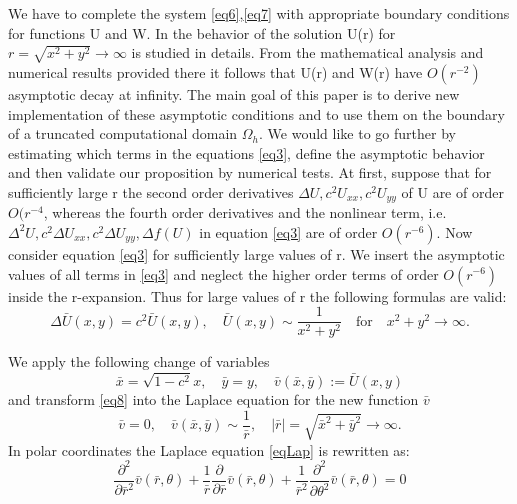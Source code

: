 \documentclass[12pt]{article}
\theoremstyle{theorem}
\theoremstyle{defi}
\begin{document}
We have to complete the system \ref{eq6},\ref{eq7} with appropriate boundary conditions for functions U and W. In \cite{ref6} the behavior of the solution U(r) for  $ r=\sqrt{x^2 + y^2}\rightarrow \infty$ is studied in details. From the mathematical analysis and numerical results provided there it follows that U(r) and W(r) have  $O(r^{-2})$ asymptotic decay at infinity. 
The main goal of this paper is to derive new implementation of these asymptotic conditions and to use them on the boundary of a truncated computational domain $\Omega_h$.
	We would like to go further by estimating which terms in the equations \ref{eq3},  define the asymptotic behavior and then validate our proposition by numerical tests. At first, suppose that for sufficiently large r the second order derivatives $\Delta U , c^2U_{xx} , c^2U_{yy}$  of U are of order  $O(r^{-4}$, whereas the fourth order derivatives and the nonlinear term, i.e.  $\Delta^2 U , c^2\Delta U_{xx} , c^2\Delta U_{yy}, \Delta f(U)$    in equation \ref{eq3} are of order $O(r^{-6})$.  
Now consider equation \ref{eq3} for sufficiently large values of r. We insert the asymptotic values of all terms in \ref{eq3} and neglect the higher order terms of order $O(r^{-6})$ inside the r-expansion. Thus for large values of r the following formulas are valid:
\begin{equation}
 \Delta \bar{U}(x,y) =   c^2   \bar{U}(x,y) , \quad  \bar{U}(x,y) \sim \frac{1}{x^2 + y^2} \quad \text{for} \quad x^2 + y^2 \rightarrow \infty  . \label{eq8}
\end{equation}


We apply the following change of variables
\begin{equation}
\bar{x} = \sqrt{1-c^2}x , \quad  \bar{y} = y, \quad \bar{v}( \bar{x}, \bar{y}) := \bar{U} (x, y)\label{eqVC}
\end{equation}
and transform \ref{eq8} into the Laplace equation for the new function $\bar{v}$
\begin{equation} \label{eqLap}
\bar{v} = 0, \quad \bar{v}( \bar{x}, \bar{y}) \sim \frac{1}{\bar{r}}, \quad |\bar{r}|=\sqrt{\bar{x}^2 + \bar{y}^2} \rightarrow \infty.
\end{equation}
In polar coordinates the Laplace equation \ref{eqLap} is rewritten as:
\begin{equation} \label{eqLapPol}
\frac{\partial^2}{\partial \bar{r}^2} \bar{v}(\bar{r}, \theta) + \frac{1}{\bar{r}} \frac{\partial}{\partial \bar{r}}\bar{v}(\bar{r}, \theta) +  \frac{1}{\bar{r}^2} \frac{\partial^2}{\partial \theta^2} \bar{v}(\bar{r}, \theta) = 0
\end{equation}
\end{document}
